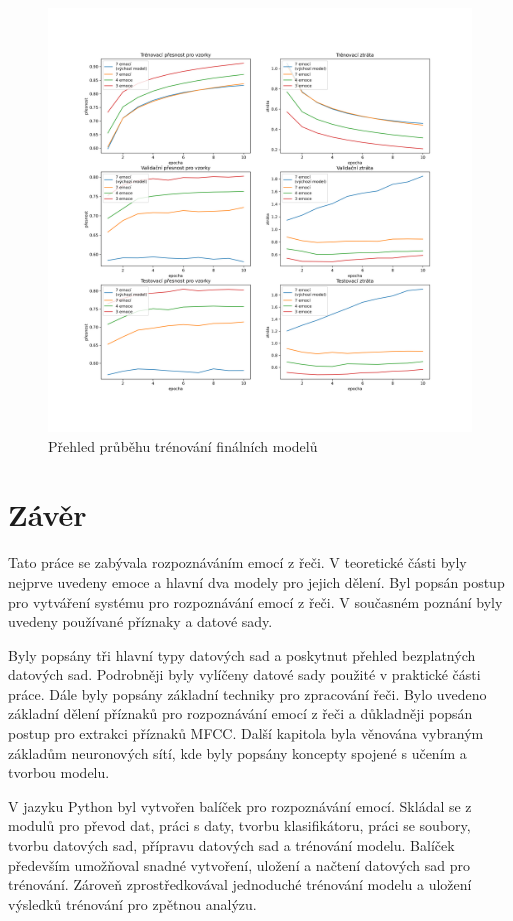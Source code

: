 \documentclass[FM,BP]{tulthesis}
\begin{document}
\begin{figure}[!htbp]
\centerline{\includegraphics[scale=.5]{training_course-final_more.png}}
\caption{Přehled průběhu trénování finálních modelů}
\label{fig:training_course-final_more}
\end{figure}
\FloatBarrier

\chapter{Závěr} %
Tato práce se zabývala rozpoznáváním emocí z řeči. V teoretické části byly nejprve uvedeny emoce a hlavní dva modely pro jejich dělení. Byl popsán postup pro vytváření systému pro rozpoznávání emocí z řeči. V současném poznání byly uvedeny používané příznaky a datové sady.

Byly popsány tři hlavní typy datových sad a poskytnut přehled bezplatných datových sad. Podrobněji byly vylíčeny datové sady použité v praktické části práce. Dále byly popsány základní techniky pro zpracování řeči. Bylo uvedeno základní dělení příznaků pro rozpoznávání emocí z řeči a důkladněji popsán postup pro extrakci příznaků MFCC. Další kapitola byla věnována vybraným základům neuronových sítí, kde byly popsány koncepty spojené s učením a tvorbou modelu.

V jazyku Python byl vytvořen balíček pro rozpoznávání emocí. Skládal se z modulů pro převod dat, práci s daty, tvorbu klasifikátoru, práci se soubory, tvorbu datových sad, přípravu datových sad a trénování modelu. Balíček především umožňoval snadné vytvoření, uložení a načtení datových sad pro trénování. Zároveň zprostředkovával jednoduché trénování modelu a uložení výsledků trénování pro zpětnou analýzu.
\end{document}

